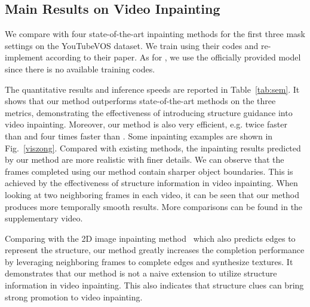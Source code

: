 \subsection{Main Results on Video Inpainting}

We compare with four state-of-the-art inpainting methods for the first three mask settings on the YouTubeVOS dataset.
%
We train \cite{nazeri2019edgeconnect,Xu_2019_CVPR} using their codes and re-implement \cite{wang2019video} according to their paper. As for \cite{Kim_2019_CVPR1}, we use the officially provided model since there is no available training codes.

The quantitative results and inference speeds are reported in Table~\ref{tab:sem}.
It shows that our method outperforms state-of-the-art methods on the three metrics, demonstrating the effectiveness of introducing structure guidance into video inpainting.
Moreover, our method is also very efficient, e.g. twice faster than \cite{Kim_2019_CVPR1} and four times faster than \cite{Xu_2019_CVPR}. 
%
Some inpainting examples are shown in Fig.~\ref{viszong}.
Compared with existing methods, the inpainting results predicted by our method are more realistic with finer details. 
We can observe that the frames completed using our method contain sharper object boundaries. This is achieved by the effectiveness of structure information in video inpainting.
%
When looking at two neighboring frames in each video, it can be seen that our method produces more temporally smooth results. More comparisons can be found in the supplementary video.




Comparing with the 2D image inpainting method~\cite{nazeri2019edgeconnect} which also predicts edges to represent the structure, our method greatly increases the completion performance by leveraging neighboring frames to complete edges and synthesize textures. 
%
It demonstrates that our method is not a naive extension to utilize structure information in video inpainting.
This also indicates that structure clues can bring strong promotion to video inpainting.




%





